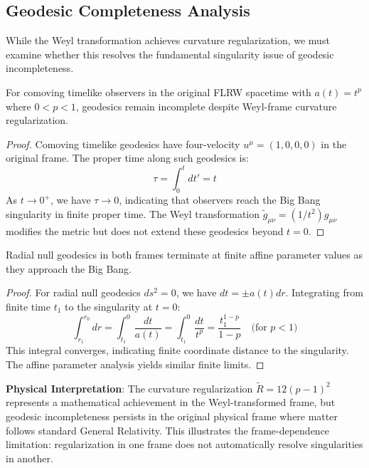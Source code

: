 \subsection{Geodesic Completeness Analysis}
\label{subsec:geodesic_completeness}

While the Weyl transformation achieves curvature regularization, we must examine whether this resolves the fundamental singularity issue of geodesic incompleteness.

\begin{proposition}
\label{prop:original_geodesic_incompleteness}
For comoving timelike observers in the original FLRW spacetime with $a(t) = t^p$ where $0 < p < 1$, geodesics remain incomplete despite Weyl-frame curvature regularization.
\end{proposition}

\begin{proof}
Comoving timelike geodesics have four-velocity $u^\mu = (1,0,0,0)$ in the original frame. The proper time along such geodesics is:
\begin{equation}
\tau = \int_0^t dt' = t
\end{equation}
As $t \to 0^+$, we have $\tau \to 0$, indicating that observers reach the Big Bang singularity in finite proper time. The Weyl transformation $\tilde{g}_{\mu\nu} = (1/t^2) g_{\mu\nu}$ modifies the metric but does not extend these geodesics beyond $t = 0$.
\end{proof}

\begin{proposition}
\label{prop:null_geodesic_behavior}
Radial null geodesics in both frames terminate at finite affine parameter values as they approach the Big Bang.
\end{proposition}

\begin{proof}
For radial null geodesics $ds^2 = 0$, we have $dt = \pm a(t) dr$. Integrating from finite time $t_1$ to the singularity at $t = 0$:
\begin{equation}
\int_{r_1}^{r_0} dr = \int_{t_1}^0 \frac{dt}{a(t)} = \int_{t_1}^0 \frac{dt}{t^p} = \frac{t_1^{1-p}}{1-p} \quad \text{(for } p < 1 \text{)}
\end{equation}
This integral converges, indicating finite coordinate distance to the singularity. The affine parameter analysis yields similar finite limits.
\end{proof}

\textbf{Physical Interpretation}: The curvature regularization $\tilde{R} = 12(p-1)^2$ represents a mathematical achievement in the Weyl-transformed frame, but geodesic incompleteness persists in the original physical frame where matter follows standard General Relativity. This illustrates the frame-dependence limitation: regularization in one frame does not automatically resolve singularities in another.

